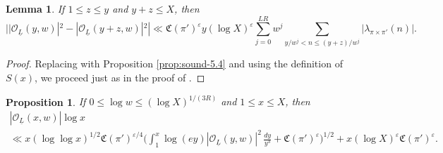 \documentclass[12pt,reqno]{amsart}
\newtheorem{lem}[thm]{Lemma}
\newtheorem{prop}[thm]{Proposition}
\theoremstyle{remark}
\numberwithin{equation}{section}
\begin{document}
	\begin{lem}
        \label{lem:6.2-Sound} 
         If $1 \le z \le y$ and $y+z \le X$, then 
	\begin{equation*}		
            ||\mathcal{O}_{\underline{L}}(y, w)|^2- |\mathcal{O}_{\underline{L}}(y+z, w)|^2| \ll \mathfrak{C}(\pi')^\varepsilon y(\log X)^\varepsilon \sum_{j=0}^{LR} w^j \sum_{y/w^j<n\le (y+z)/w^j}|\lambda_{\pi\times\pi'}(n)|.
	\end{equation*}
	\end{lem}
	\begin{proof}
        Replacing \cite[Proposition 5.4]{S} with Proposition \ref{prop:sound-5.4} and using the definition of $S(x)$, we proceed just as in the proof of \cite[Lemma 6.2]{S}.
        \end{proof}
 
	
	
	\begin{prop}\label{prop:6.3-Sound}  If $0 \le \log w \le (\log X)^{1/(3R)}$ and $1 \le x \le X$, then 
		\begin{multline*}
	|\mathcal{O}_{\underline{L}}(x, w)|\log x\\ 
		 \ll x (\log\log x)^{1/2}\mathfrak{C}(\pi')^{{\varepsilon}/{4}}\Big(\int_1^x \log(ey)|\mathcal{O}_{\underline{L}}(y,w)|^2 \, \frac{dy}{y^3}+\mathfrak{C}(\pi')^\varepsilon\Big)^{1/2} + x(\log X)^{\varepsilon}\mathfrak{C}(\pi')^\varepsilon.
		\end{multline*}
	\end{prop}
	
\end{document}
